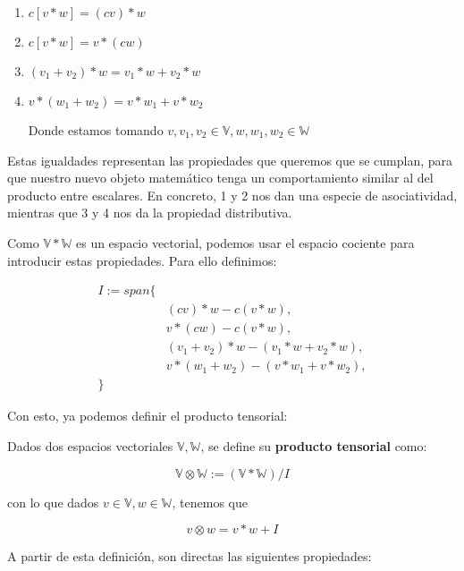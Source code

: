 \begin{enumerate}
    \item $c [v \ast w] = (cv) \ast w$
    \item $c[v \ast w] = v \ast (cw)$
    \item $(v_1 + v_2) \ast w = v_1 \ast w + v_2 \ast w$
    \item $v \ast (w_1 + w_2) = v \ast w_1 + v \ast w_2$

    Donde estamos tomando $v, v_1, v_2 \in \mathbb{V}, w, w_1, w_2 \in \mathbb{W}$
\end{enumerate}

Estas igualdades representan las propiedades que queremos que se cumplan, para que nuestro nuevo objeto matemático tenga un comportamiento similar al del producto entre escalares. En concreto, 1 y 2 nos dan una especie de asociatividad, mientras que 3 y 4 nos da la propiedad distributiva.

Como $\mathbb{V} \ast \mathbb{W}$ es un espacio vectorial, podemos usar el espacio cociente para introducir estas propiedades. Para ello definimos:

\begin{equation}
\begin{split}
    I := span\{& \\
               & (cv) \ast w - c(v \ast w), \\
               & v \ast (cw) - c(v \ast w), \\
               & (v_1 + v_2) \ast w - (v_1 \ast w + v_2 \ast w), \\
               & v \ast (w_1 + w_2) - (v \ast w_1 + v \ast w_2), \\
\}&
\end{split}
\end{equation}

Con esto, ya podemos definir el producto tensorial:

\begin{definicion}
    Dados dos espacios vectoriales $\mathbb{V}, \mathbb{W}$, se define su \textbf{producto tensorial} como:

    $$\mathbb{V} \otimes \mathbb{W} := (\mathbb{V} \ast \mathbb{W}) / I$$

    con lo que dados $v \in \mathbb{V}, w \in \mathbb{W}$, tenemos que

    $$v \otimes w = v \ast w + I$$
\end{definicion}

A partir de esta definición, son directas las siguientes propiedades:

